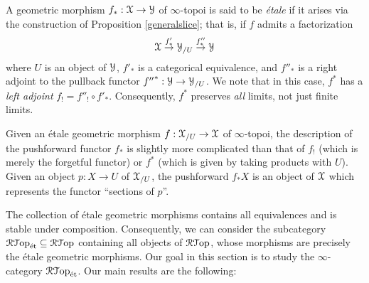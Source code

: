 A geometric morphism $f_{\ast}: \operatorname{\mathcal{X}} \rightarrow \operatorname{\mathcal{Y}}$ of $\infty$-topoi is said to be {\it \'{e}tale} if it arises via the construction of Proposition \ref{generalslice}; that is, if $f$ admits a factorization
$$ \operatorname{\mathcal{X}} \stackrel{f'_{\ast}}{\rightarrow} \operatorname{\mathcal{Y}}_{/U} \stackrel{f''_{\ast}}{\rightarrow} \operatorname{\mathcal{Y}}$$ where
$U$ is an object of $\operatorname{\mathcal{Y}}$, $f'_{\ast}$ is a categorical equivalence, and $f''_{\ast}$ is a right adjoint to the pullback functor ${f''}^{\ast}: \operatorname{\mathcal{Y}} \rightarrow \operatorname{\mathcal{Y}}_{/U}$. We note that in this case, $f^{\ast}$ has a {\em left adjoint} $f_{!} = f''_{!} \circ f'_{\ast}$. Consequently, $f^{\ast}$ preserves {\em all} limits, not just finite limits. 

\begin{remark}\label{mark}
Given an \'{e}tale geometric morphism $f: \operatorname{\mathcal{X}}_{/U} \rightarrow \operatorname{\mathcal{X}}$ of $\infty$-topoi, the
description of the pushforward functor $f_{\ast}$ is slightly more complicated than that of $f_{!}$ (which is merely the forgetful functor) or $f^{\ast}$ (which is given by taking products with $U$).
Given an object $p: X \rightarrow U$ of $\operatorname{\mathcal{X}}_{/U}$, the pushforward $f_{\ast} X$ is an object of
$\operatorname{\mathcal{X}}$ which represents the functor ``sections of $p$''.
\end{remark}

The collection of \'{e}tale geometric morphisms contains all equivalences and is stable under composition. Consequently, we can consider the subcategory $\operatorname{\mathcal{R}{\mathcal T}op}_{\text{\'{e}t}} \subseteq \operatorname{\mathcal{R}{\mathcal T}op}$ containing all objects of $\operatorname{\mathcal{R}{\mathcal T}op}$, whose morphisms are precisely the \'{e}tale geometric morphisms. Our goal in this section is to study the $\infty$-category $\operatorname{\mathcal{R}{\mathcal T}op}_{\text{\'{e}t}}$. Our main results are the following:

